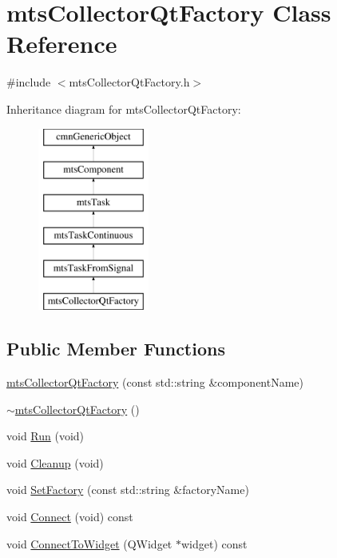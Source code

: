\hypertarget{classmts_collector_qt_factory}{}\section{mts\+Collector\+Qt\+Factory Class Reference}
\label{classmts_collector_qt_factory}


{\ttfamily \#include $<$mts\+Collector\+Qt\+Factory.\+h$>$}

Inheritance diagram for mts\+Collector\+Qt\+Factory\+:\begin{figure}[H]
\begin{center}
\leavevmode
\includegraphics[height=6.000000cm]{d7/d73/classmts_collector_qt_factory}
\end{center}
\end{figure}
\subsection*{Public Member Functions}
\begin{DoxyCompactItemize}
\item 
\hyperlink{classmts_collector_qt_factory_ae0c1eb266b29270bcfa9bde5dcbe2cdb}{mts\+Collector\+Qt\+Factory} (const std\+::string \&component\+Name)
\item 
\hyperlink{classmts_collector_qt_factory_a5358bcfb3cefb2a1fbb40ea9d7675ff7}{$\sim$mts\+Collector\+Qt\+Factory} ()
\item 
void \hyperlink{classmts_collector_qt_factory_a643e420653f8996f700acf0e1aa5d214}{Run} (void)
\item 
void \hyperlink{classmts_collector_qt_factory_a557399d603b951f78c8cda6910a69e6f}{Cleanup} (void)
\item 
void \hyperlink{classmts_collector_qt_factory_afd20dbeacf3c0c0e83f52e5b1999320b}{Set\+Factory} (const std\+::string \&factory\+Name)
\item 
void \hyperlink{classmts_collector_qt_factory_ad89a2b9e6f46617187ad486f7938020f}{Connect} (void) const 
\item 
void \hyperlink{classmts_collector_qt_factory_a566330d90cd9b942415c803f70948a0b}{Connect\+To\+Widget} (Q\+Widget $\ast$widget) const 
\end{DoxyCompactItemize}
